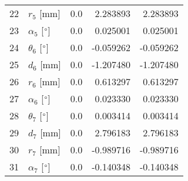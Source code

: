 \documentclass{standalone}%
\begin{document}
\begin{tabular}{llrrr}
22 &              $r_{5}$ [mm] &       0.0 &   2.283893 &   2.283893 \\
23 &  $\alpha_{5}$ [$\degree$] &       0.0 &   0.025001 &   0.025001 \\
24 &  $\theta_{6}$ [$\degree$] &       0.0 &  -0.059262 &  -0.059262 \\
25 &              $d_{6}$ [mm] &       0.0 &  -1.207480 &  -1.207480 \\
26 &              $r_{6}$ [mm] &       0.0 &   0.613297 &   0.613297 \\
27 &  $\alpha_{6}$ [$\degree$] &       0.0 &   0.023330 &   0.023330 \\
28 &  $\theta_{7}$ [$\degree$] &       0.0 &   0.003414 &   0.003414 \\
29 &              $d_{7}$ [mm] &       0.0 &   2.796183 &   2.796183 \\
30 &              $r_{7}$ [mm] &       0.0 &  -0.989716 &  -0.989716 \\
31 &  $\alpha_{7}$ [$\degree$] &       0.0 &  -0.140348 &  -0.140348 \\
\bottomrule
\end{tabular}
%
\end{document}
